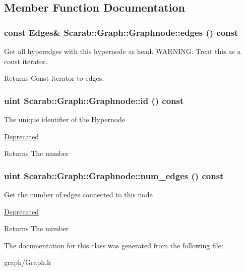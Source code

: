 \subsection{Member Function Documentation}
\hypertarget{classScarab_1_1Graph_1_1Graphnode_a4ffd990052c812242cbdeeae7b0e1104}{
\subsubsection[{edges}]{\setlength{\rightskip}{0pt plus 5cm}const Edges\& Scarab::Graph::Graphnode::edges () const}}
\label{classScarab_1_1Graph_1_1Graphnode_a4ffd990052c812242cbdeeae7b0e1104}
Get all hyperedges with this hypernode as head. WARNING: Treat this as a const iterator. \begin{DoxyReturn}{Returns}
Const iterator to edges. 
\end{DoxyReturn}
\hypertarget{classScarab_1_1Graph_1_1Graphnode_a74eaaed5d31a0a2c0445f3de0859148f}{
\subsubsection[{id}]{\setlength{\rightskip}{0pt plus 5cm}uint Scarab::Graph::Graphnode::id () const}}
\label{classScarab_1_1Graph_1_1Graphnode_a74eaaed5d31a0a2c0445f3de0859148f}
The unique identifier of the Hypernode \begin{Desc}
\item[\hyperlink{deprecated__deprecated000001}{Deprecated}]\end{Desc}
\begin{DoxyReturn}{Returns}
The number 
\end{DoxyReturn}
\hypertarget{classScarab_1_1Graph_1_1Graphnode_a78229cc45113d24f1373a50a13bc7be4}{
\subsubsection[{num\_\-edges}]{\setlength{\rightskip}{0pt plus 5cm}uint Scarab::Graph::Graphnode::num\_\-edges () const}}
\label{classScarab_1_1Graph_1_1Graphnode_a78229cc45113d24f1373a50a13bc7be4}
Get the number of edges connected to this node \begin{Desc}
\item[\hyperlink{deprecated__deprecated000002}{Deprecated}]\end{Desc}
\begin{DoxyReturn}{Returns}
The number 
\end{DoxyReturn}


The documentation for this class was generated from the following file:\begin{DoxyCompactItemize}
\item 
graph/Graph.h\end{DoxyCompactItemize}
